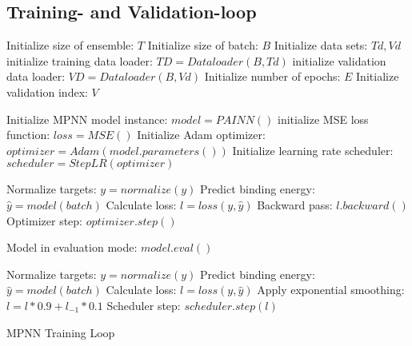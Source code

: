 
\subsection{Training- and Validation-loop}\label{subsec:training}


\begin{algorithm}[H]
    \begin{algorithmic}[1]
        \State Initialize size of ensemble: $T$
        \State Initialize size of batch: $B$
        \State Initialize data sets: $Td, Vd$
        \State initialize training data loader: $TD = Dataloader(B,Td)$
        \State initialize validation data loader: $VD = Dataloader(B,Vd)$
        \State Initialize number of epochs: $E$
        \State Initialize validation index: $V$


        \State Initialize MPNN model instance: $model = PAINN()$
        \State initialize MSE loss function: $loss = MSE()$
        \State Initialize Adam optimizer: $optimizer = Adam(model.parameters())$
        \State Initialize learning rate scheduler: $scheduler = StepLR(optimizer)$



        \State Normalize targets: $y = normalize(y)$
        \State Predict binding energy: $\hat{y} = model(batch)$
        \State Calculate loss: $l = loss(y,\hat{y})$
        \State Backward pass: $l.backward()$
        \State Optimizer step: $optimizer.step()$

        \State Model in evaluation mode: $model.eval()$


        \State Normalize targets: $y = normalize(y)$
        \State Predict binding energy: $\hat{y} = model(batch)$
        \State Calculate loss: $l = loss(y,\hat{y})$
        \State Apply exponential smoothing: $l = l * 0.9 + l_{-1} * 0.1$
        \State Scheduler step: $scheduler.step(l)$
        \EndFor

        \EndIf
        \EndFor
        \EndFor
        \EndFor
    \end{algorithmic}
    \caption{MPNN Training Loop}
    \label{algo:MPNN_training}
\end{algorithm}

